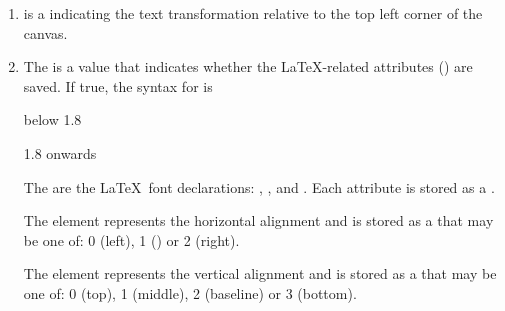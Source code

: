 \begin{numbered}
\begin{enumerate}
  The  is a  indicating the font shape (0 for
  upright, 1 for emphasized, 2 for italic, 3 for slanted and 4 for
  smallcaps).  Version 1.6 and below only permitted 0 or 1 for the shape.
  Although the file format allows five different shape styles,
   only supports plain or italic, so when
  rendering on the \gls{canvas}, \FlowframTk\ treats emphasized,
  italic and slanted as  and the other styles as
  . The  option
  in the font style dialogs actually sets the shape to type~1 (emphasized) rather
  than type~2.

  The  is a  indicating the font weight (0 for medium,
  1 for bold).

  For versions below 1.8 the font size is a non-negative
  , otherwise it's stored as a non-negative
  .

  \item {} is a  indicating the
  text transformation relative to the top left corner of the
  \gls{canvas}.

  \item\label{jdr:latexspecs} The  is a  value that indicates
  whether the \LaTeX-related attributes () are saved.
  If true, the syntax for  is
  \begin{jdrversion}{below 1.8}
  \begin{syntaxline}
     
  \end{syntaxline}
  \end{jdrversion}
  \begin{jdrversion}{1.8 onwards}
  \begin{syntaxline}
     
   
  \end{syntaxline}
  \end{jdrversion}
  The  are the \LaTeX\ font declarations: ,
  ,  and . Each attribute is
  stored as a .

  The  element represents the horizontal alignment and
  is stored as a  that may be one of: 0 (left), 1
  () or 2 (right).

  The  element represents the vertical alignment and
  is stored as a  that may be one of: 0 (top), 1
  (middle), 2 (baseline) or 3 (bottom).


\end{enumerate}
\end{numbered}

